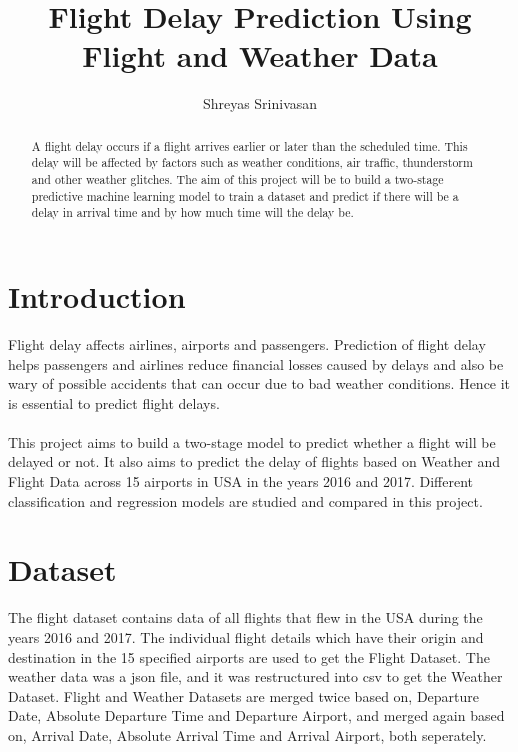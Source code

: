 \documentclass[12pt,letter-paper]{article}
\begin{document}
\title{Flight Delay Prediction Using Flight and Weather Data}
\author{Shreyas Srinivasan}
\date{}
\maketitle

\begin{abstract}
    
    A flight delay occurs if a flight arrives earlier or later than the scheduled time. This delay will be affected by factors such as weather conditions, air traffic, thunderstorm and other weather glitches. The aim of this project will be to build a two-stage predictive machine learning model to train a dataset and predict if there will be a delay in arrival time and by how much time will the delay be.
   
\end{abstract}


\section{Introduction}

    Flight delay affects airlines, airports and passengers. Prediction of flight delay helps passengers and airlines reduce financial losses caused by delays and also be wary of possible accidents that can occur due to bad weather conditions. Hence it is essential to predict flight delays. 

    \paragraph{}
    
    This project aims to build a two-stage model to predict whether a flight will be delayed or not. It also aims to predict the delay of flights based on Weather and Flight Data across 15 airports in USA in the years 2016 and 2017. Different classification and regression models are studied and compared in this project.
    
\section{Dataset}
   
     The flight dataset contains data of all flights that flew in the USA during the years 2016 and 2017. The individual flight details which have their origin and destination in the 15 specified airports are used to get the Flight Dataset. The weather data was a json file, and it was restructured into csv to get the Weather Dataset. Flight and Weather Datasets are merged twice based on, Departure Date, Absolute Departure Time and Departure Airport, and merged again based on, Arrival Date, Absolute Arrival Time and Arrival Airport, both seperately.
    
\end{document}
